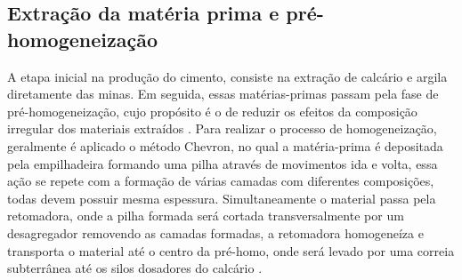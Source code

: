         \begin{figure}[h!] 
   	    \captionsetup{width=16cm}%
	\end{figure}


 \pagebreak

 \subsection{Extração da matéria prima e pré-homogeneização}

A etapa inicial na produção do cimento, consiste na extração de calcário e argila diretamente das minas. Em seguida, essas matérias-primas passam pela fase de pré-homogeneização, cujo propósito é o de reduzir os efeitos da composição irregular dos materiais extraídos \cite{Andre2011}. Para realizar o processo de homogeneização, geralmente é aplicado o método Chevron, no qual a matéria-prima é depositada pela empilhadeira formando uma pilha através de movimentos ida e volta, essa ação se repete com a formação de várias camadas com diferentes composições, todas devem possuir mesma espessura. Simultaneamente o material passa pela retomadora, onde a pilha formada será cortada transversalmente por um desagregador removendo as camadas formadas, a retomadora homogeneíza e transporta o material até o centro da pré-homo, onde será levado por uma correia subterrânea até os silos dosadores do calcário \cite{Carvalho2023}.

 	\begin{figure}[h!] 
   	    \captionsetup{width=16cm}%
	\end{figure}

